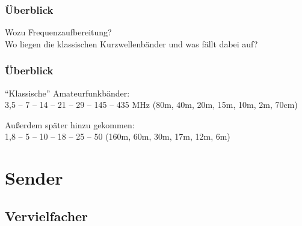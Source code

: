\begin{frame}
  \frametitle{Überblick}

  Wozu Frequenzaufbereitung?\\[2em]
  Wo liegen die klassischen Kurzwellenbänder und
  was fällt dabei auf?

\end{frame}

\begin{frame}
  \frametitle{Überblick}

  ``Klassische'' Amateurfunkbänder: \\[2em]

  3,5 -- 7 -- 14 -- 21 -- 29 -- 145 -- 435 MHz (80m, 40m, 20m, 15m, 10m, 2m, 70cm)

  \vspace{3em}

  Außerdem später hinzu gekommen: \\[2em]

  1,8 -- 5 -- 10 -- 18 -- 25 -- 50 (160m, 60m, 30m, 17m, 12m, 6m)


\end{frame}

\section{Sender}

\subsection{Vervielfacher}

